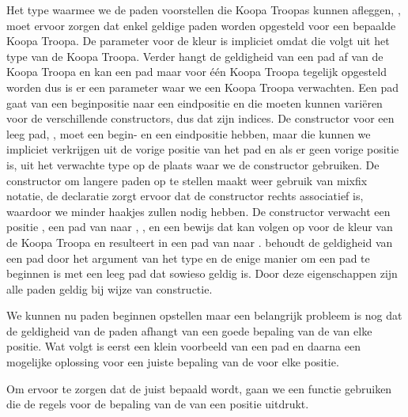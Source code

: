 
Het type waarmee we de paden voorstellen die Koopa Troopas kunnen afleggen,
, moet ervoor zorgen dat enkel geldige paden worden opgesteld voor
een bepaalde Koopa Troopa. De parameter voor de kleur is impliciet omdat die
volgt uit het type van de Koopa Troopa. Verder hangt de geldigheid van een pad
af van de Koopa Troopa en kan een pad maar voor één Koopa Troopa tegelijk
opgesteld worden dus is er een parameter waar we een Koopa Troopa verwachten.
Een pad gaat van een beginpositie naar een eindpositie en die moeten kunnen
variëren voor de verschillende constructors, dus dat zijn indices. De
constructor voor een leeg pad, \iagda{[]}, moet een begin- en een eindpositie
hebben, maar die kunnen we impliciet verkrijgen uit de vorige positie van het
pad en als er geen vorige positie is, uit het verwachte type op de plaats waar
we de constructor gebruiken. De constructor om langere paden op te stellen
maakt weer gebruik van mixfix notatie, de  declaratie zorgt
ervoor dat de constructor rechts associatief is, waardoor we minder haakjes
zullen nodig hebben. De constructor verwacht een positie , een pad van
 naar , , en een bewijs dat  kan volgen op
 voor de kleur van de Koopa Troopa en resulteert in een pad van
 naar .  behoudt de geldigheid van een pad door
het argument van het type  en de enige manier om een pad te
beginnen is met een leeg pad dat sowieso geldig is. Door deze eigenschappen
zijn alle paden geldig bij wijze van constructie.

We kunnen nu paden beginnen opstellen maar een belangrijk probleem is nog dat
de geldigheid van de paden afhangt van een goede bepaling van de
 van elke positie. Wat volgt is eerst een klein voorbeeld van
een pad en daarna een mogelijke oplossing voor een juiste bepaling van de
 voor elke positie.


Om ervoor te zorgen dat de  juist bepaald wordt, gaan we een
functie gebruiken die de regels voor de bepaling van de  van
een positie uitdrukt.


